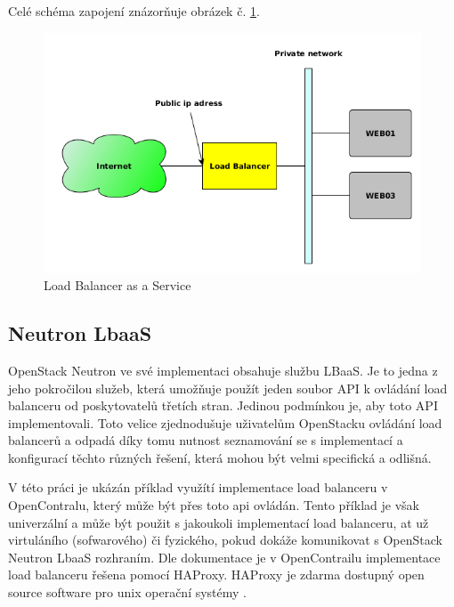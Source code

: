 Celé schéma zapojení znázorňuje obrázek č. \ref{fig:LoadBalancer}. 

\begin{figure}[h]
\begin{centering}
\includegraphics[scale=0.55]{images/LoadBalancer}
\par\end{centering}
\caption{Load Balancer as a Service\label{fig:LoadBalancer}}
\end{figure}


\subsection{Neutron LbaaS}

OpenStack Neutron ve své implementaci obsahuje službu LBaaS. Je to jedna z jeho pokročilou služeb, která umožňuje použít jeden soubor API k ovládání load balanceru od poskytovatelů třetích stran. Jedinou podmínkou je, aby toto API implementovali. Toto velice zjednodušuje uživatelům OpenStacku ovládání load balancerů a odpadá díky tomu nutnost seznamování se s implementací a konfigurací těchto různých řešení, která mohou být velmi specifická a odlišná.

V této práci je ukázán příklad využítí implementace load balanceru v OpenContralu, který může být přes toto api ovládán. Tento příklad je však univerzální a může být použit s jakoukoli implementací load balanceru, at už virtuláního (sofwarového) či fyzického, pokud dokáže komunikovat s OpenStack Neutron LbaaS rozhraním. Dle dokumentace \cite{contrail_loadbalancer} je v OpenContrailu implementace load balanceru řešena pomocí HAProxy. HAProxy je zdarma dostupný open source software pro unix operační systémy \cite{HAProxy}. 

